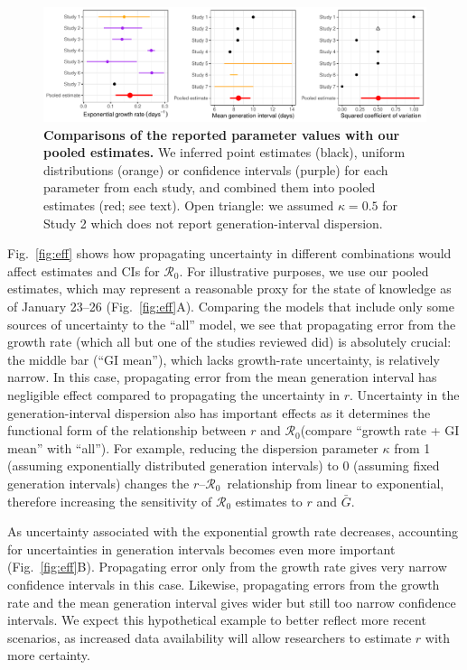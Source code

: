 \documentclass[12pt]{article}
\newcommand{\fref}[1]{Fig.~\ref{fig:#1}}
\newcommand{\Ro}{\ensuremath{{\mathcal R}_{0}}\xspace}
\begin{document}
\begin{figure}[t]
\includegraphics[width=\textwidth]{compare_assumption.pdf}
\caption{
\textbf{Comparisons of the reported parameter values with our pooled estimates.}
We inferred point estimates (black), uniform distributions (orange) or confidence intervals (purple) for each parameter from each study, and combined them into pooled estimates (red; see text).
Open triangle: we assumed $\kappa=0.5$ for Study 2 which does not report generation-interval dispersion.
}
\label{fig:assumption}
\end{figure}

\fref{eff} shows how propagating uncertainty in different combinations would affect estimates and CIs for \Ro. For illustrative purposes, we use our pooled estimates, which may represent a reasonable proxy for the state of knowledge as of January 23--26 (\fref{eff}A).
Comparing the models that include only some sources of uncertainty to the ``all'' model, we see that propagating error from the growth rate (which all but one of the studies reviewed did) is absolutely crucial: the middle bar (``GI mean''), which lacks growth-rate uncertainty, is relatively narrow.
In this case, propagating error from the mean generation interval has negligible effect compared to propagating the uncertainty in $r$.
Uncertainty in the generation-interval dispersion also has important effects as it determines the functional form of the relationship between $r$ and \Ro (compare ``growth rate + GI mean'' with ``all'').
For example, reducing the dispersion parameter $\kappa$ from 1 (assuming exponentially distributed generation intervals) to 0 (assuming fixed generation intervals) changes the $r$--\Ro\ relationship from linear to exponential, therefore increasing the sensitivity of \Ro estimates to $r$ and $\bar G$.

As uncertainty associated with the exponential growth rate decreases, accounting for uncertainties in generation intervals becomes even more important (\fref{eff}B).
Propagating error only from the growth rate gives very narrow confidence intervals in this case. 
Likewise, propagating errors from the growth rate and the mean generation interval gives wider but still too narrow confidence intervals.
We expect this hypothetical example to better reflect more recent scenarios, as increased data availability will allow researchers to estimate $r$ with more certainty.
\end{document}
